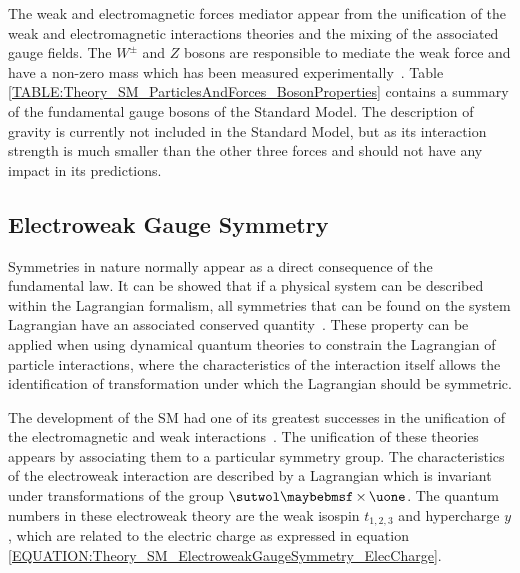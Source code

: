 The weak and electromagnetic forces mediator appear from the unification of the weak and electromagnetic interactions theories and the mixing of the associated gauge fields. The $W^{\pm}$ and $Z$ bosons are responsible to mediate the weak force and have a non-zero mass which has been measured experimentally~\cite{ARTICLE:TEVATRONcombinedWmass,ARTICLE:DELPHIMassZ,ARTICLE:PDG2014}. Table \ref{TABLE:Theory_SM_ParticlesAndForces_BosonProperties} contains a summary of the fundamental gauge bosons of the Standard Model. The description of gravity is currently not included in the Standard Model, but as its interaction strength is much smaller than the other three forces and should not have any impact in its predictions.



\subsection{Electroweak Gauge Symmetry}
\label{SUBSECTION:Theory_SM_ElectroweakGaugeSymmetry}


Symmetries in nature normally appear as a direct consequence of the fundamental law. It can be showed that if a physical system can be described within the Lagrangian formalism, all symmetries that can be found on the system Lagrangian have an associated conserved quantity~\cite{ARTICLE:InvariantVariationProblems}. These property can be applied when using dynamical quantum theories to constrain the Lagrangian of particle interactions, where the characteristics of the interaction itself allows the identification of transformation under which the Lagrangian should be symmetric.

The development of the \gls{SM} had one of its greatest successes in the unification of the electromagnetic and weak interactions~\cite{ARTICLE:Glashow,ARTICLE:Weinberg,ARTICLE:Salam}. The unification of these theories appears by associating them to a particular symmetry group. The characteristics of the electroweak interaction are described by a Lagrangian which is invariant under transformations of the group $\sutwol\times\uone$. The quantum numbers in these electroweak theory are the weak isospin $t_{1,2,3}$ and hypercharge $y$, which are related to the electric charge as expressed in equation \ref{EQUATION:Theory_SM_ElectroweakGaugeSymmetry_ElecCharge}.

